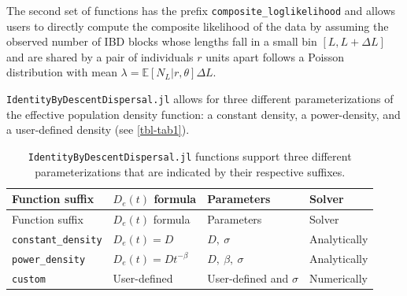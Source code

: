 \documentclass[
]{article}
\begin{document}
The second set of functions has the prefix
\texttt{composite\_loglikelihood} and allows users to directly compute
the composite likelihood of the data by assuming the observed number of
IBD blocks whose lengths fall in a small bin \([L, L+\Delta L]\) and are
shared by a pair of individuals \(r\) units apart follows a Poisson
distribution with mean
\(\lambda = \mathbb{E}[N_L | r, \theta] \Delta L\).

\texttt{IdentityByDescentDispersal.jl} allows for three different parameterizations of the effective population density function:
a constant density, a power-density, and a user-defined density (see \autoref{tbl-tab1}).

\begin{longtable}[]{@{}
  >{\raggedright\arraybackslash}p{}
  >{\raggedright\arraybackslash}p{}
  >{\raggedright\arraybackslash}p{}
  >{\raggedright\arraybackslash}p{}@{}}
\caption{\texttt{IdentityByDescentDispersal.jl} functions support three
different parameterizations that are indicated by their respective
suffixes. \label{tbl-tab1}}\tabularnewline
\toprule\noalign{}
\begin{minipage}[b]{\linewidth}\raggedright
Function suffix
\end{minipage} & \begin{minipage}[b]{\linewidth}\raggedright
\(D_e(t)\) formula
\end{minipage} & \begin{minipage}[b]{\linewidth}\raggedright
Parameters
\end{minipage} & \begin{minipage}[b]{\linewidth}\raggedright
Solver
\end{minipage} \\
\midrule\noalign{}
\endfirsthead
\toprule\noalign{}
\begin{minipage}[b]{\linewidth}\raggedright
Function suffix
\end{minipage} & \begin{minipage}[b]{\linewidth}\raggedright
\(D_e(t)\) formula
\end{minipage} & \begin{minipage}[b]{\linewidth}\raggedright
Parameters
\end{minipage} & \begin{minipage}[b]{\linewidth}\raggedright
Solver
\end{minipage} \\
\midrule\noalign{}
\endhead
\bottomrule\noalign{}
\endlastfoot
\texttt{constant\_density} & \(D_e(t)=D\) & \(D,\ \sigma\) &
Analytically \\
\texttt{power\_density} & \(D_e(t)=Dt^{-\beta}\) &
\(D,\ \beta,\ \sigma\) & Analytically \\
\texttt{custom} & User-defined & User-defined and \(\sigma\) &
Numerically \\
\end{longtable}
\end{document}
